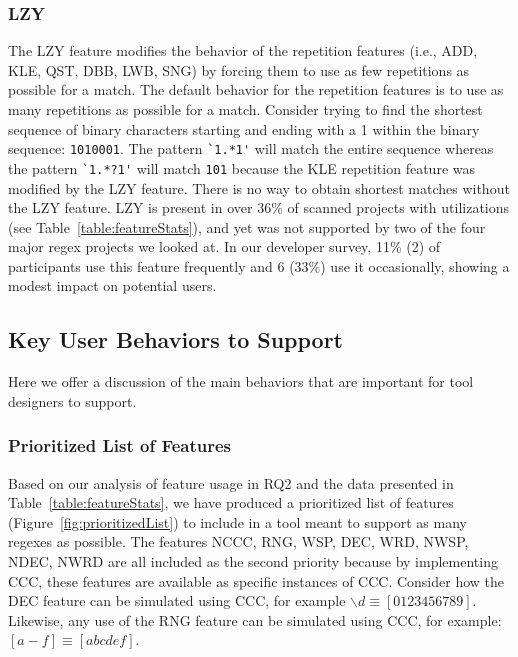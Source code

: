 \subsubsection{LZY}
The LZY feature modifies the behavior of the repetition features (i.e., ADD, KLE, QST, DBB, LWB, SNG) by forcing them to use as few repetitions as possible for a match.  The default behavior for the repetition features is to use as many repetitions as possible for a match.  Consider trying to find the shortest sequence of binary characters starting and ending with a 1 within the binary sequence: {\tt 1010001}. The pattern \verb!`1.*1'! will match the entire sequence whereas the pattern \verb!`1.*?1'! will match {\tt 101} because the KLE repetition feature was modified by the LZY feature.  There is no way to obtain shortest matches without the LZY feature.  LZY is present in over 36\% of scanned projects with utilizations (see Table~\ref{table:featureStats}), and yet was not supported by two of the four major regex projects we looked at.
In our developer survey, 11\% (2) of participants use this feature frequently and 6 (33\%) use it occasionally, showing a modest impact on potential users.

\subsection{Key User Behaviors to Support}
Here we offer a discussion of the main behaviors that are important for tool designers to support.
\leavevmode\color{gray}
\subsubsection{Prioritized List of Features}
\label{sec:prioritizedList}
Based on our analysis of feature usage in RQ2 and the data presented in Table~\ref{table:featureStats}, we have produced a prioritized list of features (Figure~\ref{fig:prioritizedList}) to include in a tool meant to support as many regexes as possible. The features NCCC, RNG, WSP, DEC, WRD, NWSP, NDEC, NWRD are all included as the second priority because by implementing CCC, these features are available as specific instances of CCC.  Consider how the DEC feature can be simulated using CCC, for example  $\backslash d \equiv [0123456789]$. Likewise, any use of the RNG feature can be simulated using CCC, for example: $[a-f] \equiv [abcdef]$.

